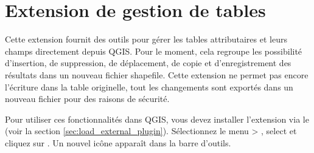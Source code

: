 \section{Extension de gestion de tables}\label{sec:ftools}

Cette extension fournit des outils pour gérer les tables attributaires et leurs champs directement depuis QGIS. Pour le moment, cela regroupe les possibilité d'insertion, de suppression, de déplacement, de copie et d'enregistrement des résultats dans un nouveau fichier shapefile. Cette extension ne permet pas encore l'écriture dans la table originelle, tout les changements sont exportés dans un nouveau fichier pour des raisons de sécurité.


Pour utiliser ces fonctionnalités dans QGIS, vous devez installer l'extension via le\\  (voir la section 
\ref{sec:load_external_plugin}). Sélectionnez le menu  > , select  et cliquez sur . Un nouvel icône  apparaît dans la barre d'outils.
